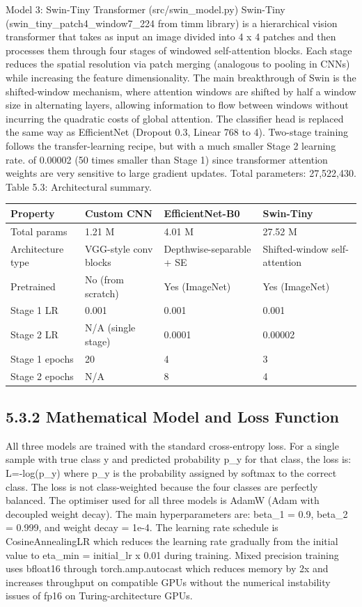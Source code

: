 \documentclass[12pt,a4paper,oneside]{report}
\begin{document}
Model 3: Swin-Tiny Transformer (src/swin\_model.py)
Swin-Tiny (swin\_tiny\_patch4\_window7\_224 from timm library) is a hierarchical vision transformer that takes as input an image divided into 4 x 4 patches and then processes them through four stages of windowed self-attention blocks. Each stage reduces the spatial resolution via patch merging (analogous to pooling in CNNs) while increasing the feature dimensionality. The main breakthrough of Swin is the shifted-window mechanism, where attention windows are shifted by half a window size in alternating layers, allowing information to flow between windows without incurring the quadratic costs of global attention.
The classifier head is replaced the same way as EfficientNet (Dropout 0.3, Linear 768 to 4). Two-stage training follows the transfer-learning recipe, but with a much smaller Stage 2 learning rate. of 0.00002 (50 times smaller than Stage 1) since transformer attention weights are very sensitive to large gradient updates. Total parameters: 27,522,430.
Table 5.3: Architectural summary.
\begin{center}
\small
\begin{tabularx}{\textwidth}{YYYY}
\toprule
\textbf{Property} & \textbf{Custom CNN} & \textbf{EfficientNet-B0} & \textbf{Swin-Tiny} \\
\midrule
Total params & 1.21 M & 4.01 M & 27.52 M \\
Architecture type & VGG-style conv blocks & Depthwise-separable + SE & Shifted-window self-attention \\
Pretrained & No (from scratch) & Yes (ImageNet) & Yes (ImageNet) \\
Stage 1 LR & 0.001 & 0.001 & 0.001 \\
Stage 2 LR & N/A (single stage) & 0.0001 & 0.00002 \\
Stage 1 epochs & 20 & 4 & 3 \\
Stage 2 epochs & N/A & 8 & 4 \\
\bottomrule
\end{tabularx}
\end{center}
\subsection*{5.3.2 Mathematical Model and Loss Function}
All three models are trained with the standard cross-entropy loss. For a single sample with true class y and predicted probability p\_y for that class, the loss is:
    L=-log(p\_y)
where p\_y is the probability assigned by softmax to the correct class. The loss is not class-weighted because the four classes are perfectly balanced.
The optimiser used for all three models is AdamW (Adam with decoupled weight decay). The main hyperparameters are: beta\_1 = 0.9, beta\_2 = 0.999, and weight decay = 1e-4. The learning rate schedule is CosineAnnealingLR which reduces the learning rate gradually from the initial value to eta\_min = initial\_lr x 0.01 during training. Mixed precision training uses bfloat16 through torch.amp.autocast which reduces memory by 2x and increases throughput on compatible GPUs without the numerical instability issues of fp16 on Turing-architecture GPUs.
\end{document}
